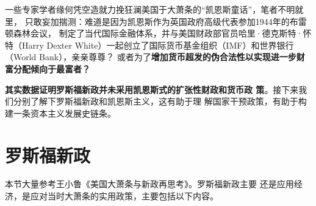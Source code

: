 一些专家学者缘何凭空造就力挽狂澜美国于大萧条的“凯恩斯童话”，笔者不明就里，
只敢妄加揣测：难道是因为凯恩斯作为英国政府高级代表参加1944年的布雷顿森林会议，
制定了当代国际金融体系，并与美国财政部官员哈里·德克斯特·怀特（Harry Dexter
White）一起创立了国际货币基金组织（IMF）和世界银行（World Bank），亲亲尊尊？
或者为了\textbf{增加货币超发的伪合法性以实现进一步财富分配倾向于最富者？}


\textbf{其实数据证明罗斯福新政并未采用凯恩斯式的扩张性财政和货币政
  策}\cite{bijiao202002}。接下来我们分别了解下罗斯福新政和凯恩斯主义，这有助于理
解国家干预政策，有助于构建一条资本主义发展史链条。



\section{罗斯福新政}

本节大量参考王小鲁《美国大萧条与新政再思考》\cite{bijiao202002}。罗斯福新政主要
还是应用经济，是应对当时大萧条的实用政策，主要包括以下内容。

